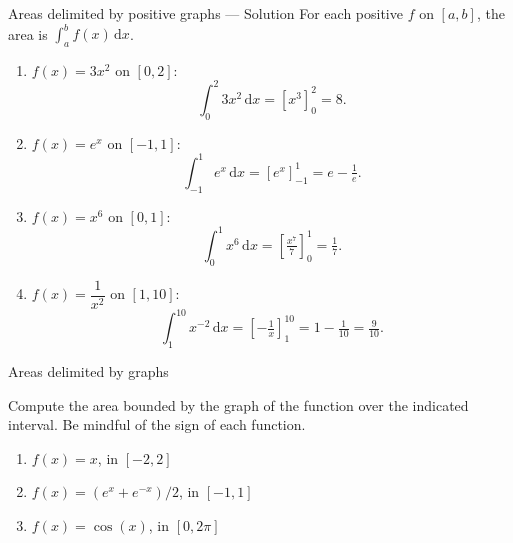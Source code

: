\documentclass[9pt]{beamer}
\begin{document}
\begin{frame}{Areas delimited by positive graphs  —  Solution}
\small
For each positive $f$ on $[a,b]$, the area is $\displaystyle \int_a^b f(x)\,\mathrm{d}x$.
\begin{enumerate}[leftmargin=0.5cm,label=(\alph*),rightmargin=0.2cm]
  \item $f(x)=3x^2$ on $[0,2]$:
  \[
  \int_0^2 3x^2\,\mathrm{d}x=\left[x^3\right]_0^2=\boxed{8}.
  \]

  \item $f(x)=e^{x}$ on $[-1,1]$:
  \[
  \int_{-1}^{1} e^x\,\mathrm{d}x=\left[e^x\right]_{-1}^{1}=\boxed{e-\tfrac{1}{e}}.
  \]

  \item $f(x)=x^6$ on $[0,1]$:
  \[
  \int_0^1 x^6\,\mathrm{d}x=\left[\tfrac{x^7}{7}\right]_0^1=\boxed{\tfrac{1}{7}}.
  \]

  \item $f(x)=\dfrac{1}{x^2}$ on $[1,10]$:
  \[
  \int_1^{10} x^{-2}\,\mathrm{d}x=\left[-\tfrac{1}{x}\right]_1^{10}=1-\tfrac{1}{10}=\boxed{\tfrac{9}{10}}.
  \]
\end{enumerate}
\end{frame}

\begin{frame}{Areas delimited by graphs}

    Compute the area bounded by the graph of the function over the indicated interval. Be mindful of the sign of each function.

    \begin{enumerate}[leftmargin = 0.5cm, label = (\alph*), rightmargin = 0.2cm]

        \item $f(x) = x$, in $[-2, 2]$

        \item $f(x) = (e^{x} + e^{-x})/2$, in $[-1, 1]$

        \item $f(x) = \cos(x)$, in $[0, 2\pi]$
        
    \end{enumerate}
    
\end{frame}
\end{document}
